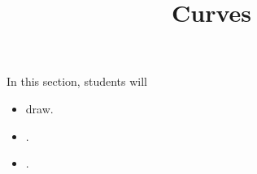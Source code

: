 \documentclass{ximera}
\title{Curves}
\begin{document}
\begin{abstract}
%
\end{abstract}
\maketitle























\begin{sectionOutcomes}
In this section, students will 

\begin{itemize}
\item draw.
\item .
\item .
\end{itemize}
\end{sectionOutcomes}
\end{document}
